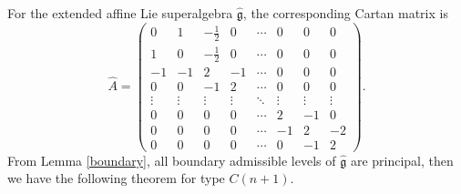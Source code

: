 \documentclass[12pt]{article}
\newtheorem{lem}[thm]{Lemma}
\begin{document}
For the extended affine Lie superalgebra $\widehat{\mathfrak{g}}$,
the corresponding Cartan matrix is
$$\widehat{A}=\begin{pmatrix}
0&1&-\frac{1}{2}&0&\cdots &0& 0 & 0\\
 1&0 & -\frac{1}{2} &0& \cdots &0& 0 & 0\\
-1& -1 & 2 &-1& \cdots &0& 0 & 0\\
0& 0 & -1 &2& \cdots &0& 0 & 0\\
  \vdots &\vdots &  \vdots &\vdots & \ddots& \vdots& \vdots & \vdots \\
0&  0 & 0 &0& \cdots&2&-1 & 0\\
 0& 0 & 0 &0& \cdots&-1&2 & -2\\
0& 0 & 0 &0& \cdots&0&-1 & 2
\end{pmatrix}
.$$
From Lemma \ref{boundary}, all boundary admissible levels of $\widehat{\mathfrak{g}}$ are principal,
then we have the following theorem for type $C(n+1)$.
\end{document}
